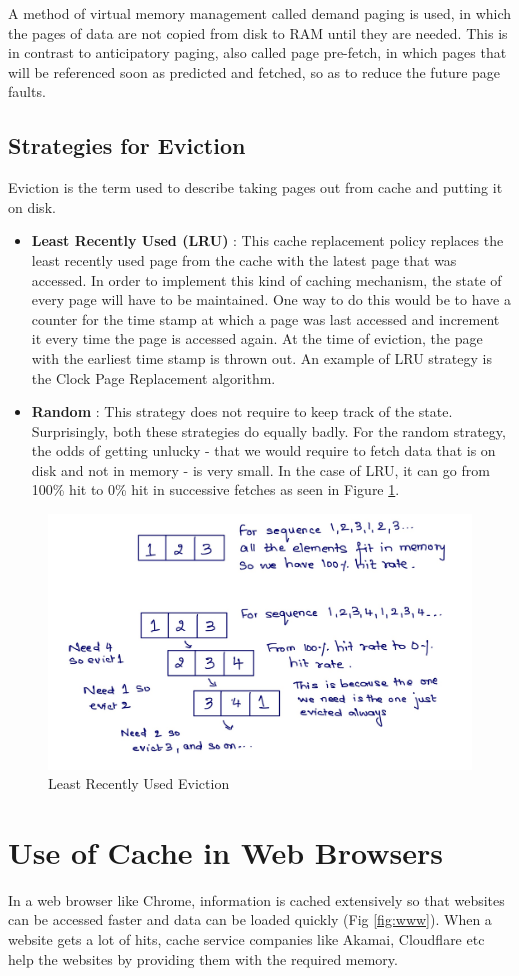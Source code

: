 \documentclass[twoside]{article}
\begin{document}
A method of virtual memory management called demand paging is used, in which the pages of data are not copied from disk to RAM until they are needed. This is in contrast to anticipatory paging, also called page pre-fetch, in which pages that will be referenced soon as predicted and fetched, so as to reduce the future page faults. 
\\
\subsection{Strategies for Eviction}
Eviction is the term used to describe taking pages out from cache and putting it on disk. 
\begin{itemize}
\item \textbf {Least Recently Used (LRU)} : This cache replacement policy replaces the least recently used page from the cache with the latest page that was accessed. In order to implement this kind of caching mechanism, the state of every page will have to be maintained. One way to do this would be to have a counter for the time stamp at which a page was last accessed and increment it every time the page is accessed again. At the time of eviction, the page with the earliest time stamp is thrown out. An example of LRU strategy is the Clock Page Replacement algorithm.
\item \textbf {Random} : This strategy does not require to keep track of the state. 
Surprisingly, both these strategies do equally badly. For the random strategy, the odds of getting unlucky - that we would require to fetch data that is on disk and not in memory - is very small. In the case of LRU, it can go from 100\% hit to 0\% hit in successive fetches as seen in Figure \ref{fig:lru}.   
\end{itemize}

\begin{figure}[htp]
	\centering
  \includegraphics[width=0.5\linewidth]{Image-1-1.jpg}
  \caption{Least Recently Used Eviction}
  \label{fig:lru}
\end{figure}

\section{Use of Cache in Web Browsers}
In a web browser like Chrome, information is cached extensively so that websites can be accessed faster and data can be loaded quickly (Fig \ref{fig:www}). When a website gets a lot of hits, cache service companies like Akamai, Cloudflare etc help the websites by providing them with the required memory.    \\\\
\end{document}
